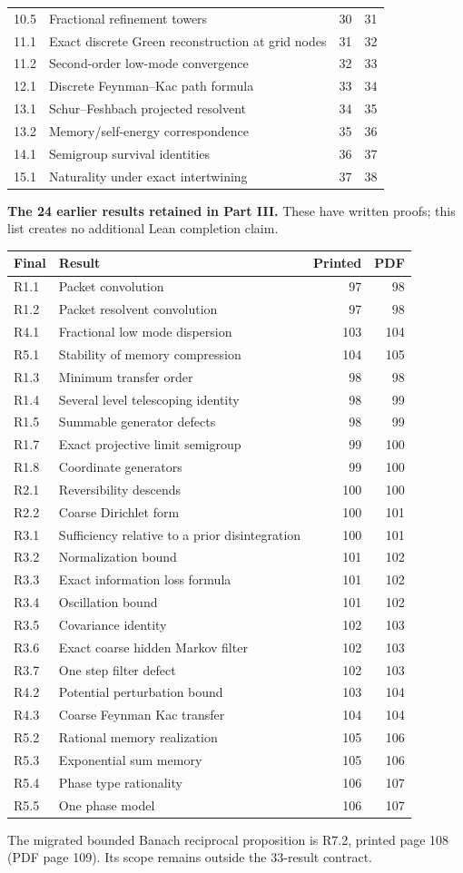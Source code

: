 \begin{longtable}{@{}p{.12\linewidth}p{.61\linewidth}rr@{}}
10.5 & Fractional refinement towers & 30 & 31\\
11.1 & Exact discrete Green reconstruction at grid nodes & 31 & 32\\
11.2 & Second-order low-mode convergence & 32 & 33\\
12.1 & Discrete Feynman--Kac path formula & 33 & 34\\
13.1 & Schur--Feshbach projected resolvent & 34 & 35\\
13.2 & Memory/self-energy correspondence & 35 & 36\\
14.1 & Semigroup survival identities & 36 & 37\\
15.1 & Naturality under exact intertwining & 37 & 38\\
\bottomrule\end{longtable}
\textbf{The 24 earlier results retained in Part III.} These have written proofs; this list creates no additional Lean completion claim.
\begin{longtable}{@{}p{.12\linewidth}p{.61\linewidth}rr@{}}\toprule Final & Result & Printed & PDF\\\midrule\endhead
R1.1 & Packet convolution & 97 & 98\\
R1.2 & Packet resolvent convolution & 97 & 98\\
R4.1 & Fractional low mode dispersion & 103 & 104\\
R5.1 & Stability of memory compression & 104 & 105\\
R1.3 & Minimum transfer order & 98 & 98\\
R1.4 & Several level telescoping identity & 98 & 99\\
R1.5 & Summable generator defects & 98 & 99\\
R1.7 & Exact projective limit semigroup & 99 & 100\\
R1.8 & Coordinate generators & 99 & 100\\
R2.1 & Reversibility descends & 100 & 100\\
R2.2 & Coarse Dirichlet form & 100 & 101\\
R3.1 & Sufficiency relative to a prior disintegration & 100 & 101\\
R3.2 & Normalization bound & 101 & 102\\
R3.3 & Exact information loss formula & 101 & 102\\
R3.4 & Oscillation bound & 101 & 102\\
R3.5 & Covariance identity & 102 & 103\\
R3.6 & Exact coarse hidden Markov filter & 102 & 103\\
R3.7 & One step filter defect & 102 & 103\\
R4.2 & Potential perturbation bound & 103 & 104\\
R4.3 & Coarse Feynman Kac transfer & 104 & 104\\
R5.2 & Rational memory realization & 105 & 106\\
R5.3 & Exponential sum memory & 105 & 106\\
R5.4 & Phase type rationality & 106 & 107\\
R5.5 & One phase model & 106 & 107\\
\bottomrule\end{longtable}
The migrated bounded Banach reciprocal proposition is R7.2, printed page 108 (PDF page 109). Its scope remains outside the 33-result contract.
